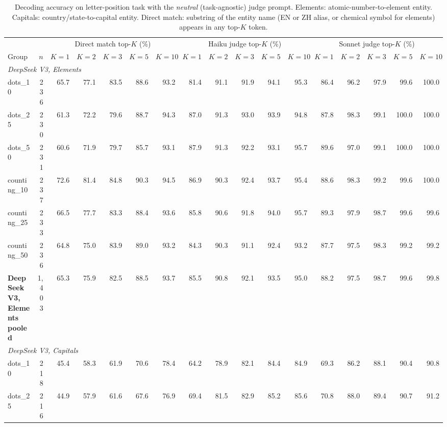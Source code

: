 \begin{table}[h]
\centering
\small
\caption{Decoding accuracy on letter-position task with the \emph{neutral} (task-agnostic) judge prompt. Elements: atomic-number-to-element entity. Capitals: country/state-to-capital entity. Direct match: substring of the entity name (EN or ZH alias, or chemical symbol for elements) appears in any top-$K$ token.}
\label{tab:decode_letterpos_neutral}
\begin{tabular}{l r r r r r r r r r r r r r r r r}
\toprule
& & \multicolumn{5}{c}{Direct match top-$K$ (\%)} & \multicolumn{5}{c}{Haiku judge top-$K$ (\%)} & \multicolumn{5}{c}{Sonnet judge top-$K$ (\%)} \\
\cmidrule(lr){3-7} \cmidrule(lr){8-12} \cmidrule(lr){13-17}
Group & $n$ & $K{=}1$ & $K{=}2$ & $K{=}3$ & $K{=}5$ & $K{=}10$ & $K{=}1$ & $K{=}2$ & $K{=}3$ & $K{=}5$ & $K{=}10$ & $K{=}1$ & $K{=}2$ & $K{=}3$ & $K{=}5$ & $K{=}10$ \\
\midrule
\multicolumn{17}{l}{\textit{DeepSeek V3, Elements}} \\
dots\_10 & 236 & 65.7 & 77.1 & 83.5 & 88.6 & 93.2 & 81.4 & 91.1 & 91.9 & 94.1 & 95.3 & 86.4 & 96.2 & 97.9 & 99.6 & 100.0 \\
dots\_25 & 230 & 61.3 & 72.2 & 79.6 & 88.7 & 94.3 & 87.0 & 91.3 & 93.0 & 93.9 & 94.8 & 87.8 & 98.3 & 99.1 & 100.0 & 100.0 \\
dots\_50 & 231 & 60.6 & 71.9 & 79.7 & 85.7 & 93.1 & 87.9 & 91.3 & 92.2 & 93.1 & 95.7 & 89.6 & 97.0 & 99.1 & 100.0 & 100.0 \\
counting\_10 & 237 & 72.6 & 81.4 & 84.8 & 90.3 & 94.5 & 86.9 & 90.3 & 92.4 & 93.7 & 95.4 & 88.6 & 98.3 & 99.2 & 99.6 & 100.0 \\
counting\_25 & 233 & 66.5 & 77.7 & 83.3 & 88.4 & 93.6 & 85.8 & 90.6 & 91.8 & 94.0 & 95.7 & 89.3 & 97.9 & 98.7 & 99.6 & 99.6 \\
counting\_50 & 236 & 64.8 & 75.0 & 83.9 & 89.0 & 93.2 & 84.3 & 90.3 & 91.1 & 92.4 & 93.2 & 87.7 & 97.5 & 98.3 & 99.2 & 99.2 \\
\addlinespace[2pt]
\textbf{DeepSeek V3, Elements pooled} & 1,403 & 65.3 & 75.9 & 82.5 & 88.5 & 93.7 & 85.5 & 90.8 & 92.1 & 93.5 & 95.0 & 88.2 & 97.5 & 98.7 & 99.6 & 99.8 \\
\multicolumn{17}{l}{\textit{DeepSeek V3, Capitals}} \\
dots\_10 & 218 & 45.4 & 58.3 & 61.9 & 70.6 & 78.4 & 64.2 & 78.9 & 82.1 & 84.4 & 84.9 & 69.3 & 86.2 & 88.1 & 90.4 & 90.8 \\
dots\_25 & 216 & 44.9 & 57.9 & 61.6 & 67.6 & 76.9 & 69.4 & 81.5 & 82.9 & 85.2 & 85.6 & 70.8 & 88.0 & 89.4 & 90.7 & 91.2 \\

\end{tabular}
\end{table}
